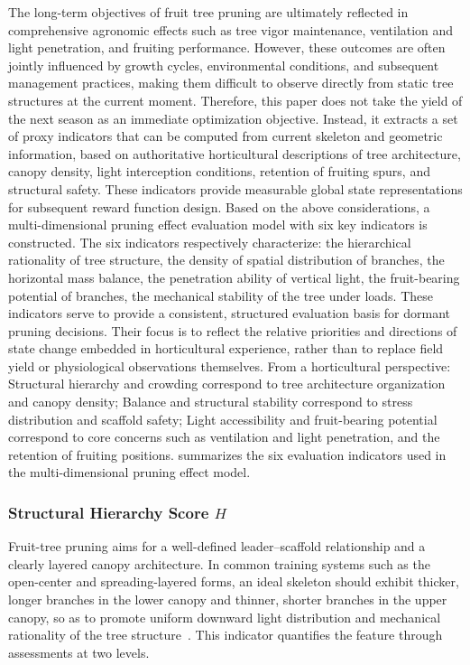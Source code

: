 \documentclass[12pt,a4paper,fontset=fandol]{ctexart}
\begin{document}
The long-term objectives of fruit tree pruning are ultimately reflected in comprehensive agronomic effects such as tree vigor maintenance, ventilation and light penetration, and fruiting performance. However, these outcomes are often jointly influenced by growth cycles, environmental conditions, and subsequent management practices, making them difficult to observe directly from static tree structures at the current moment. Therefore, this paper does not take the yield of the next season as an immediate optimization objective. Instead, it extracts a set of proxy indicators that can be computed from current skeleton and geometric information, based on authoritative horticultural descriptions of tree architecture, canopy density, light interception conditions, retention of fruiting spurs, and structural safety. These indicators provide measurable global state representations for subsequent reward function design.
Based on the above considerations, a multi-dimensional pruning effect evaluation model with six key indicators is constructed. The six indicators respectively characterize: the hierarchical rationality of tree structure, the density of spatial distribution of branches, the horizontal mass balance, the penetration ability of vertical light, the fruit-bearing potential of branches, the mechanical stability of the tree under loads.
These indicators serve to provide a consistent, structured evaluation basis for dormant pruning decisions. Their focus is to reflect the relative priorities and directions of state change embedded in horticultural experience, rather than to replace field yield or physiological observations themselves. From a horticultural perspective: Structural hierarchy and crowding correspond to tree architecture organization and canopy density; Balance and structural stability correspond to stress distribution and scaffold safety; Light accessibility and fruit-bearing potential correspond to core concerns such as ventilation and light penetration, and the retention of fruiting positions.
 summarizes the six evaluation indicators used in the multi-dimensional pruning effect model.


\subsubsection{Structural Hierarchy Score $H$}

Fruit-tree pruning aims for a well-defined leader--scaffold relationship and a clearly layered canopy architecture.
In common training systems such as the open-center and spreading-layered forms,
an ideal skeleton should exhibit thicker, longer branches in the lower canopy
and thinner, shorter branches in the upper canopy,
so as to promote uniform downward light distribution and mechanical rationality of the tree structure~\citep{he2018review}.
This indicator quantifies the feature through assessments at two levels.
\end{document}
